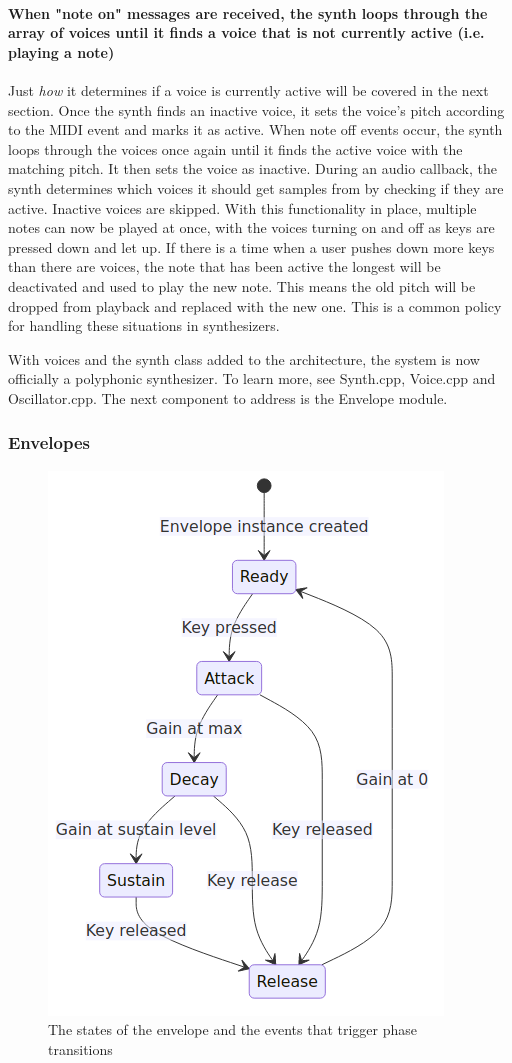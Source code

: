 \documentclass[acmlarge,screen]{acmart}
\begin{document}
	\paragraph{When "note on" messages are received, the synth loops through the array of voices until it finds a voice that is not currently active (i.e. playing a note)} Just \textit{how} it determines if a voice is currently active will be covered in the next section. Once the synth finds an inactive voice, it sets the voice's pitch according to the MIDI event and marks it as active. When note off events occur, the synth loops through the voices once again until it finds the active voice with the matching pitch. It then sets the voice as inactive. During an audio callback, the synth determines which voices it should get samples from by checking if they are active. Inactive voices are skipped. With this functionality in place, multiple notes can now be played at once, with the voices turning on and off as keys are pressed down and let up. If there is a time when a user pushes down more keys than there are voices, the note that has been active the longest will be deactivated and used to play the new note. This means the old pitch will be dropped from playback and replaced with the new one. This is a common policy for handling these situations in synthesizers.
	
	
	With voices and the synth class added to the architecture, the system is now officially a polyphonic synthesizer. To learn more, see Synth.cpp, Voice.cpp and Oscillator.cpp. The next component to address is the Envelope module.


	\subsubsection{Envelopes}
	
	\begin{figure}
		\centering
		\caption{The states of the envelope and the events that trigger phase transitions}
		\includegraphics[width=.5\linewidth]{envelope_state_diagram}
	\end{figure}
	
\end{document}
